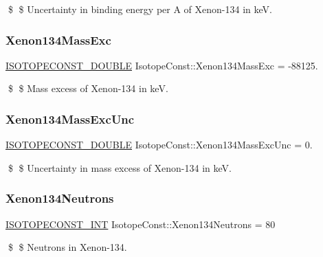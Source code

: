 \$ \$ Uncertainty in binding energy per A of Xenon-\/134 in keV. \mbox{\label{group___isotope_const-_xenon-_xe134_gac1867d1bcfc5cd650afdc1f7eb0e5e8a}} 
\subsubsection{\texorpdfstring{Xenon134\+Mass\+Exc}{Xenon134MassExc}}
{\footnotesize\ttfamily \mbox{\hyperlink{group___isotope_const-_macros_ga8f45a7272ce02c0b4c65c44636ed719a}{I\+S\+O\+T\+O\+P\+E\+C\+O\+N\+S\+T\+\_\+\+D\+O\+U\+B\+LE}} Isotope\+Const\+::\+Xenon134\+Mass\+Exc = -\/88125.}

\$ \$ Mass excess of Xenon-\/134 in keV. \mbox{\label{group___isotope_const-_xenon-_xe134_ga45884f87593d2e05705f9c98138455c9}} 
\subsubsection{\texorpdfstring{Xenon134\+Mass\+Exc\+Unc}{Xenon134MassExcUnc}}
{\footnotesize\ttfamily \mbox{\hyperlink{group___isotope_const-_macros_ga8f45a7272ce02c0b4c65c44636ed719a}{I\+S\+O\+T\+O\+P\+E\+C\+O\+N\+S\+T\+\_\+\+D\+O\+U\+B\+LE}} Isotope\+Const\+::\+Xenon134\+Mass\+Exc\+Unc = 0.}

\$ \$ Uncertainty in mass excess of Xenon-\/134 in keV. \mbox{\label{group___isotope_const-_xenon-_xe134_gaef70894683a6cb0cb64bd31b29c4fa16}} 
\subsubsection{\texorpdfstring{Xenon134\+Neutrons}{Xenon134Neutrons}}
{\footnotesize\ttfamily \mbox{\hyperlink{group___isotope_const-_macros_ga5f18360b3e99483a35c32d789e62621c}{I\+S\+O\+T\+O\+P\+E\+C\+O\+N\+S\+T\+\_\+\+I\+NT}} Isotope\+Const\+::\+Xenon134\+Neutrons = 80}

\$ \$ Neutrons in Xenon-\/134. \mbox{\label{group___isotope_const-_xenon-_xe134_gab265b0657dd46017d38ae4e370e127eb}} 
